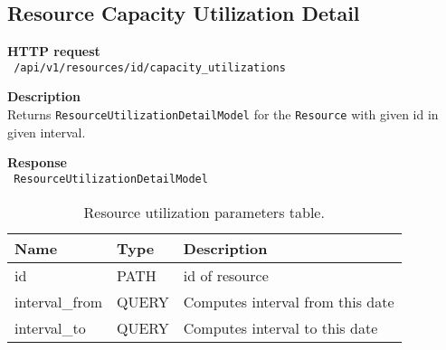 \subsection{Resource Capacity Utilization Detail}
\begin{description}
    \item \textbf{HTTP request}\\
        \texttt{\text{[GET]} /api/v1/resources/{id}/capacity\_utilizations}
    \item \textbf{Description}\\
        Returns \texttt{ResourceUtilizationDetailModel} for the \texttt{Resource} with given id in given interval.
    \item \textbf{Response}\\
        \texttt{\text{[200 OK]} ResourceUtilizationDetailModel}
\end{description}
\begin{table}[ht!]
    \begin{tabularx}{\textwidth}{llX}
        \toprule
        Name & Type & Description \\
        \midrule
        id & PATH & id of resource \\
        interval\_from & QUERY & Computes interval from this date \\  
        interval\_to & QUERY & Computes interval to this date \\
        \end{tabularx}
    \caption{Resource utilization parameters table.}
\end{table}
